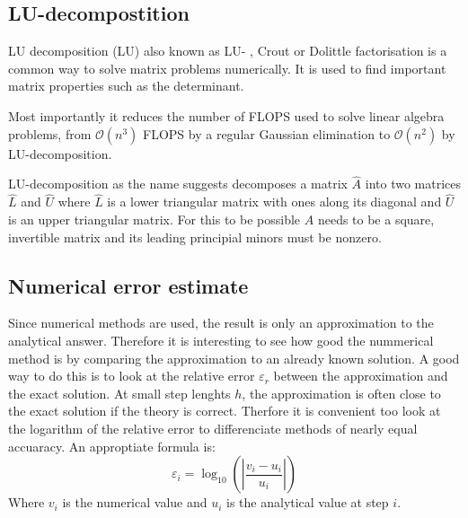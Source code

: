 \documentclass[twoside,twocolumn]{article}
\newcommand{\nl}{

\medskip
\noindent
}
\begin{document}
\subsection{LU-decompostition}
LU decomposition (LU) also known as LU- , Crout or Dolittle factorisation \cite{linalg:lay}\cite{compfys} is a common way to solve matrix problems numerically. It is used to find important matrix properties such as the determinant.
\nl
Most importantly it reduces the number of FLOPS used to solve linear algebra problems, from 
$\mathcal{O}(n^3)$ FLOPS by a regular Gaussian elimination to $\mathcal{O}(n^2)$ by LU-decomposition. 
\nl
LU-decomposition as the name suggests decomposes a matrix $\hat{A}$ into two matrices $\hat{L}$ and $\hat{U}$ where $\hat{L}$ is a lower triangular matrix with ones along its diagonal and $\hat{U}$ is an upper triangular matrix. For this to be possible $\hat{A}$ needs to be a square, invertible matrix and its leading principial minors must be nonzero.

\subsection{Numerical error estimate}
Since numerical methods are used, the result is only an approximation to the analytical answer.
Therefore it is interesting to see how good the nummerical method is by comparing the approximation to an already known solution.    
A good way to do this is to look at the relative error $\varepsilon_r$ between the approximation and the exact solution. At small step lenghts $h$, the approximation is often close to the exact solution if the theory is correct. Therfore it is convenient too look at the logarithm of the relative error to differenciate methods of nearly equal accuaracy. An approptiate formula is:
\begin{equation}
\varepsilon_i = \log_{10}\left(\left|\frac{v_i - u_i}{u_i}\right|\right)\label{eq:num_err}
\end{equation}
Where $v_i$ is the numerical value and $u_i$ is the analytical value at step $i$.
\newpage
\end{document}
